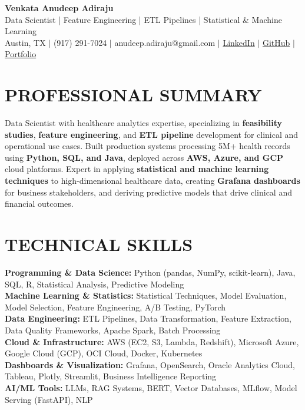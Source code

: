 \documentclass[10pt,letterpaper]{article}
\begin{document}
\begin{center}
    {\Large \textbf{Venkata Anudeep Adiraju}} \\
    {\small Data Scientist | Feature Engineering | ETL Pipelines | Statistical \& Machine Learning} \\
    \vspace{1pt}
    {\small Austin, TX $|$ (917) 291-7024 $|$ anudeep.adiraju@gmail.com $|$ \href{https://linkedin.com/in/adirajuadi}{LinkedIn} $|$ \href{https://github.com/anudeepadi}{GitHub} $|$ \href{https://anudeepadi.com}{Portfolio}}
\end{center}

\section{PROFESSIONAL SUMMARY}
{\small Data Scientist with healthcare analytics expertise, specializing in \textbf{feasibility studies}, \textbf{feature engineering}, and \textbf{ETL pipeline} development for clinical and operational use cases. Built production systems processing 5M+ health records using \textbf{Python, SQL, and Java}, deployed across \textbf{AWS, Azure, and GCP} cloud platforms. Expert in applying \textbf{statistical and machine learning techniques} to high-dimensional healthcare data, creating \textbf{Grafana dashboards} for business stakeholders, and deriving predictive models that drive clinical and financial outcomes.}

\section{TECHNICAL SKILLS}
{\small
\textbf{Programming \& Data Science:} Python (pandas, NumPy, scikit-learn), Java, SQL, R, Statistical Analysis, Predictive Modeling \\
\textbf{Machine Learning \& Statistics:} Statistical Techniques, Model Evaluation, Model Selection, Feature Engineering, A/B Testing, PyTorch \\
\textbf{Data Engineering:} ETL Pipelines, Data Transformation, Feature Extraction, Data Quality Frameworks, Apache Spark, Batch Processing \\
\textbf{Cloud \& Infrastructure:} AWS (EC2, S3, Lambda, Redshift), Microsoft Azure, Google Cloud (GCP), OCI Cloud, Docker, Kubernetes \\
\textbf{Dashboards \& Visualization:} Grafana, OpenSearch, Oracle Analytics Cloud, Tableau, Plotly, Streamlit, Business Intelligence Reporting \\
\textbf{AI/ML Tools:} LLMs, RAG Systems, BERT, Vector Databases, MLflow, Model Serving (FastAPI), NLP}
\end{document}
